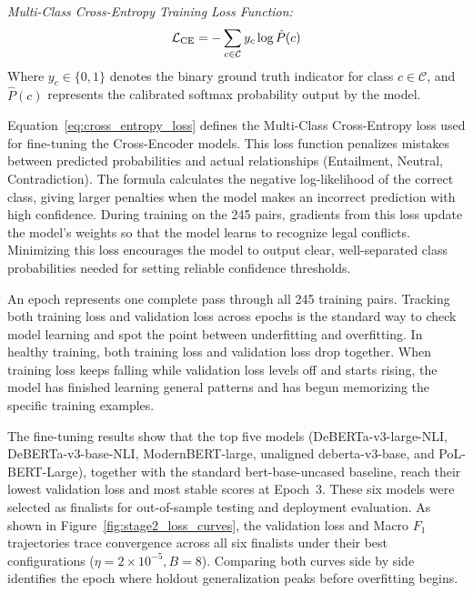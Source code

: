 \noindent\textit{Multi-Class Cross-Entropy Training Loss Function:}
\begin{equation}
    \mathcal{L}_{\text{CE}} = -\sum_{c \in \mathcal{C}} y_c \log \hat{P}(c)
    \label{eq:cross_entropy_loss}
    \eqcaption{Multi-Class Cross-Entropy Training Loss Function}
\end{equation}
\noindent Where $y_c \in \{0, 1\}$ denotes the binary ground truth indicator for class $c \in \mathcal{C}$, and $\hat{P}(c)$ represents the calibrated softmax probability output by the model.

Equation~\ref{eq:cross_entropy_loss} defines the Multi-Class Cross-Entropy loss used for fine-tuning the Cross-Encoder models. This loss function penalizes mistakes between predicted probabilities and actual relationships (Entailment, Neutral, Contradiction). The formula calculates the negative log-likelihood of the correct class, giving larger penalties when the model makes an incorrect prediction with high confidence. During training on the 245 pairs, gradients from this loss update the model's weights so that the model learns to recognize legal conflicts. Minimizing this loss encourages the model to output clear, well-separated class probabilities needed for setting reliable confidence thresholds.

An epoch represents one complete pass through all 245 training pairs. Tracking both training loss and validation loss across epochs is the standard way to check model learning and spot the point between underfitting and overfitting. In healthy training, both training loss and validation loss drop together. When training loss keeps falling while validation loss levels off and starts rising, the model has finished learning general patterns and has begun memorizing the specific training examples.

The fine-tuning results show that the top five models (DeBERTa-v3-large-NLI, DeBERTa-v3-base-NLI, ModernBERT-large, unaligned deberta-v3-base, and PoL-BERT-Large), together with the standard bert-base-uncased baseline, reach their lowest validation loss and most stable scores at Epoch~3. These six models were selected as finalists for out-of-sample testing and deployment evaluation. As shown in Figure~\ref{fig:stage2_loss_curves}, the validation loss and Macro $F_1$ trajectories trace convergence across all six finalists under their best configurations ($\eta = 2\times 10^{-5}, B = 8$). Comparing both curves side by side identifies the epoch where holdout generalization peaks before overfitting begins.

